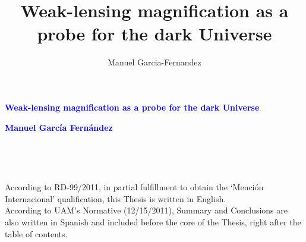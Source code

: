 \documentclass[12pt]{book} %
\begin{document}
\centering
\vspace*{5cm}
\par\normalfont\fontsize{27}{27}\sffamily\selectfont
\textcolor{blue}{\textbf{Weak-lensing magnification as a probe for the dark Universe}}\par %
\vspace*{1cm}
\textcolor{blue}{\textbf{\Huge Manuel Garc\'ia Fern\'andez}}\par %

\title{Weak-lensing magnification as a probe for the dark Universe}
\author{Manuel Garcia-Fernandez}
\endgroup


\newpage
~\vfill
\thispagestyle{empty}



\newpage
~\vfill
\thispagestyle{empty}


\newpage
\noindent
According to RD-99/2011, in partial fulfillment to obtain the `Menci\'on Internacional' qualification, this Thesis is written in English.\\
According to UAM's Normative (12/15/2011), Summary and Conclusions are also written in Spanish and included before the core of the Thesis, right after the table of contents.\\
\end{document}
